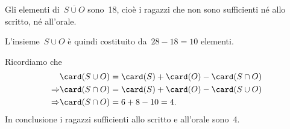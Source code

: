 \begin{exrig}
\begin{esempio}
\begin{multicols}{2}
Gli elementi di~$\overline{S\cup O}$ sono~18, cioè i ragazzi che
non sono sufficienti né allo scritto, né all'orale.
\begin{center}
 
\end{center}
\end{multicols}

L'insieme~$S\cup O$ è quindi costituito da~$28-18=10$ elementi.

Ricordiamo che
\begin{align*}
 &\card(S\cup O)=\card(S)+\card(O)-\card(S\cap O)\\
 \Rightarrow &\card(S\cap O)=\card(S)+\card(O)-\card(S\cup O)\\
 \Rightarrow &\card(S\cap O)=6+8-10=4.
\end{align*}
In conclusione i ragazzi sufficienti allo scritto e all'orale sono~4.
\end{esempio}
\end{exrig}

\ovalbox{\risolvii \ref{ese:5.78}, \ref{ese:5.79}, \ref{ese:5.80}, \ref{ese:5.81}, \ref{ese:5.82}, \ref{ese:5.83}, \ref{ese:5.84}, \ref{ese:5.85}, \ref{ese:5.86}, \ref{ese:5.87},
\ref{ese:5.88}, \ref{ese:5.89}, \ref{ese:5.90}}

\vspazio\ovalbox{\ref{ese:5.91}}

\newpage

\cleardoublepage
